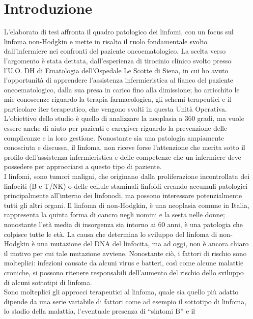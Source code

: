 \section*{Introduzione}
   
L’elaborato di tesi affronta il quadro patologico dei linfomi, con un focus sul linfoma non-Hodgkin e mette in risalto 
il ruolo fondamentale svolto dall’infermiere nei confronti del paziente oncoematologico.
La scelta verso l’argomento è stata dettata, dall’esperienza di tirocinio clinico svolto presso l’U.O. DH di Ematologia 
dell’Ospedale Le Scotte di Siena, in cui ho avuto l’opportunità di apprendere l’assistenza infermieristica al fianco del 
paziente oncoematologico, dalla sua presa in carico fino alla dimissione; ho arricchito le mie conoscenze riguardo la 
terapia farmacologica, gli schemi terapeutici e il particolare iter  terapeutico, che vengono svolti in questa Unità Operativa.\\
L’obiettivo dello studio è quello di analizzare la neoplasia a 360 gradi, ma vuole essere anche di aiuto per pazienti e 
caregiver riguardo la prevenzione delle complicanze e la loro gestione. Nonostante sia una patologia ampiamente conosciuta e 
discussa, il linfoma, non riceve forse l’attenzione che merita sotto il profilo dell’assistenza infermieristica e delle 
competenze che un infermiere deve possedere per approcciarsi a questo tipo di paziente.\\
I linfomi, sono tumori maligni, che originano dalla proliferazione incontrollata dei linfociti (B e T/NK) o delle cellule 
staminali linfoidi creando accumuli patologici principalmente all’interno dei linfonodi, ma possono interessare 
potenzialmente tutti gli altri organi. Il linfoma di non-Hodgkin, è una neoplasia comune in Italia, rappresenta la quinta 
forma di cancro negli uomini e la sesta nelle donne; nonostante l’età media di insorgenza sia intorno ai 60 anni, è una 
patologia che colpisce tutte le età. La causa che determina lo sviluppo del linfoma di non-Hodgkin è una mutazione del DNA del 
linfocita, ma ad oggi, non è ancora chiaro il motivo per cui tale mutazione avviene. Nonostante  ciò, i fattori di rischio 
sono molteplici: infezioni causate da alcuni virus e batteri, così come alcune malattie croniche, si possono ritenere 
responsabili dell’aumento del rischio dello sviluppo di alcuni sottotipi di linfoma.\\
Sono molteplici gli approcci terapeutici al linfoma, quale sia quello più adatto dipende da una serie variabile di fattori 
come ad esempio il sottotipo di linfoma, lo stadio della malattia, l’eventuale presenza di “sintomi B” e il 
